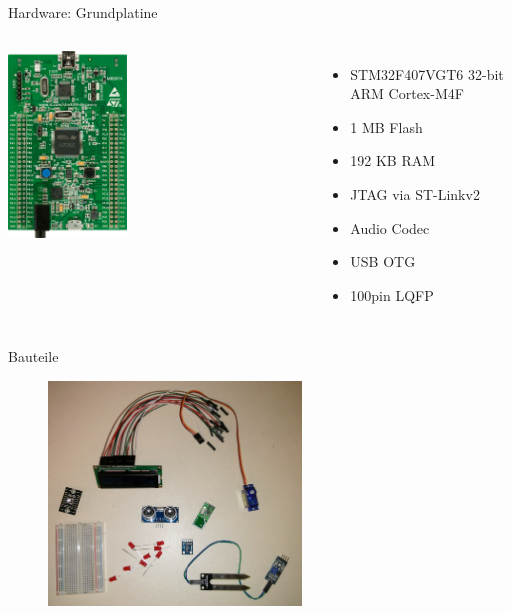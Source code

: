 \documentclass[ngerman,compress]{beamer}
\begin{document}
\begin{frame}{Hardware: Grundplatine}
	\begin{columns}
			\includegraphics[width=0.4\textwidth]{stm32f4_discovery.jpg}
			\begin{itemize}
			\item STM32F407VGT6 32-bit ARM Cortex-M4F
			\item 1 MB Flash 
			\item 192 KB RAM
			\item JTAG via ST-Linkv2
			\item Audio Codec
			\item USB OTG
			\item 100pin LQFP
			\end{itemize}
	\end{columns}
\end{frame}

\begin{frame}{Bauteile}
	\begin{figure}[h]
		\centering
		\includegraphics[width=0.6\textwidth]{bauteile.jpg}
	\end{figure}
\end{frame}
\end{document}
